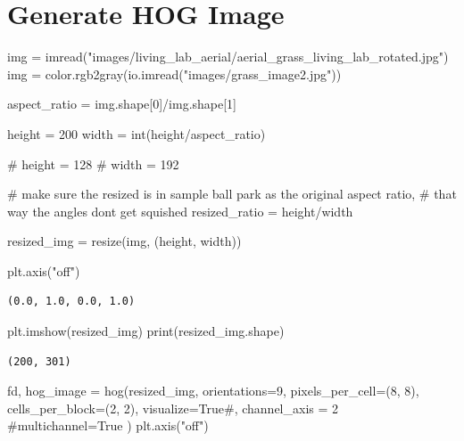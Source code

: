 \documentclass[
  letterpaper,
  DIV=11,
  numbers=noendperiod]{scrreprt}
\newenvironment{Shaded}{\begin{snugshade}}{\end{snugshade}}
\newcommand{\BuiltInTok}[1]{\textcolor[rgb]{0.00,0.23,0.31}{#1}}
\newcommand{\CommentTok}[1]{\textcolor[rgb]{0.37,0.37,0.37}{#1}}
\newcommand{\DecValTok}[1]{\textcolor[rgb]{0.68,0.00,0.00}{#1}}
\newcommand{\NormalTok}[1]{\textcolor[rgb]{0.00,0.23,0.31}{#1}}
\newcommand{\OperatorTok}[1]{\textcolor[rgb]{0.37,0.37,0.37}{#1}}
\newcommand{\StringTok}[1]{\textcolor[rgb]{0.13,0.47,0.30}{#1}}
\newcommand{\VariableTok}[1]{\textcolor[rgb]{0.07,0.07,0.07}{#1}}
\begin{document}
\hypertarget{generate-hog-image}{%
\section{Generate HOG Image}\label{generate-hog-image}}

\begin{Shaded}
\begin{Highlighting}[]
\NormalTok{img }\OperatorTok{=}\NormalTok{ imread(}\StringTok{"images/living\_lab\_aerial/aerial\_grass\_living\_lab\_rotated.jpg"}\NormalTok{)}
\NormalTok{img }\OperatorTok{=}\NormalTok{ color.rgb2gray(io.imread(}\StringTok{"images/grass\_image2.jpg"}\NormalTok{))}

\NormalTok{aspect\_ratio }\OperatorTok{=}\NormalTok{ img.shape[}\DecValTok{0}\NormalTok{]}\OperatorTok{/}\NormalTok{img.shape[}\DecValTok{1}\NormalTok{]}

\NormalTok{height }\OperatorTok{=} \DecValTok{200}
\NormalTok{width }\OperatorTok{=} \BuiltInTok{int}\NormalTok{(height}\OperatorTok{/}\NormalTok{aspect\_ratio)}

\CommentTok{\# height = 128}
\CommentTok{\# width = 192}

\CommentTok{\# make sure the resized is in sample ball park as the original aspect ratio, }
\CommentTok{\# that way the angles don\textquotesingle{}t get squished}
\NormalTok{resized\_ratio }\OperatorTok{=}\NormalTok{ height}\OperatorTok{/}\NormalTok{width}


\NormalTok{resized\_img }\OperatorTok{=}\NormalTok{ resize(img, (height, width))}

\NormalTok{plt.axis(}\StringTok{"off"}\NormalTok{)}
\end{Highlighting}
\end{Shaded}

\begin{verbatim}
(0.0, 1.0, 0.0, 1.0)
\end{verbatim}

\begin{Shaded}
\begin{Highlighting}[]
\NormalTok{plt.imshow(resized\_img)}
\BuiltInTok{print}\NormalTok{(resized\_img.shape)}
\end{Highlighting}
\end{Shaded}

\begin{verbatim}
(200, 301)
\end{verbatim}

\begin{Shaded}
\begin{Highlighting}[]
\NormalTok{fd, hog\_image }\OperatorTok{=}\NormalTok{ hog(resized\_img, orientations}\OperatorTok{=}\DecValTok{9}\NormalTok{, pixels\_per\_cell}\OperatorTok{=}\NormalTok{(}\DecValTok{8}\NormalTok{, }\DecValTok{8}\NormalTok{),}
\NormalTok{                    cells\_per\_block}\OperatorTok{=}\NormalTok{(}\DecValTok{2}\NormalTok{, }\DecValTok{2}\NormalTok{), visualize}\OperatorTok{=}\VariableTok{True}\CommentTok{\#, channel\_axis = 2 }
                    \CommentTok{\#multichannel=True}
\NormalTok{                    )}
\NormalTok{plt.axis(}\StringTok{"off"}\NormalTok{)}
\end{Highlighting}
\end{Shaded}
\end{document}
